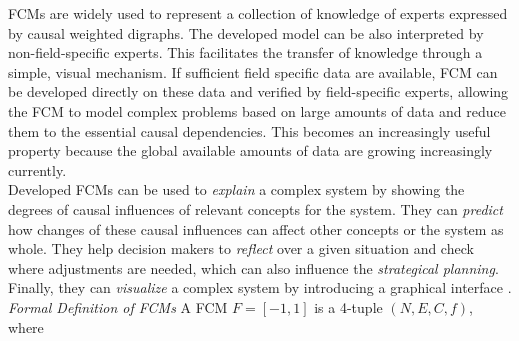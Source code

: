 \documentclass[conference]{IEEEtran}
\begin{document}
FCMs are widely used to represent a collection of knowledge of experts expressed by causal weighted digraphs. The developed model can be also interpreted by non-field-specific experts. This facilitates the transfer of knowledge through a simple, visual mechanism. If sufficient field specific data are available, FCM can be developed directly on these data and verified by field-specific experts, allowing the FCM to model complex problems based on large amounts of data and reduce them to the essential causal dependencies. This becomes an increasingly useful property because the global available amounts of data are growing increasingly currently.\\
Developed FCMs can be used to \emph{explain} a complex system by showing the degrees of causal influences of relevant concepts for the system. They can \emph{predict} how changes of these causal influences can affect other concepts or the system as whole. They help decision makers to \emph{reflect} over a given situation and check where adjustments are needed, which can also influence the \emph{strategical planning}. Finally, they can \emph{visualize} a complex system by introducing a graphical interface \cite{papageorgiou2013}.
\vspace{2mm}
\newline
\emph{Formal Definition of FCMs}
\vspace{1mm}
\newline
A FCM \begin{math} F = [-1,1] \end{math} is a 4-tuple \begin{math} (N,E,C,f) \end{math}, where
\end{document}
